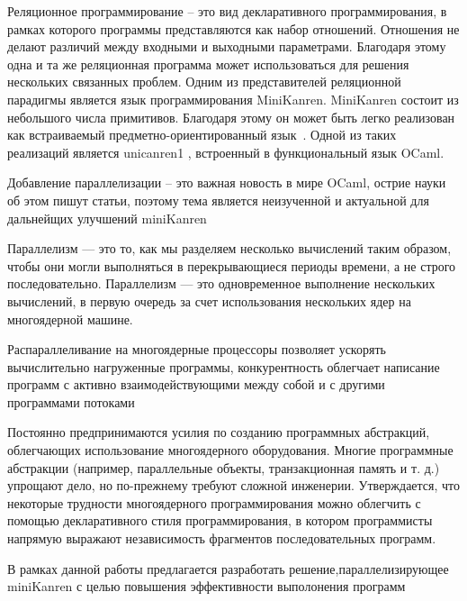

Реляционное программирование – это вид декларативного программирования, в рамках которого программы представляются как набор
отношений. Отношения не делают различий между входными и выходными параметрами. Благодаря этому одна и та же реляционная
программа может использоваться для решения нескольких связанных
проблем. Одним из представителей реляционной парадигмы является
язык программирования MiniKanren. MiniKanren состоит из небольшого числа примитивов. Благодаря этому он может быть легко реализован как встраиваемый предметно-ориентированный язык~\cite{moiseenko_podkopaev}. Одной из
таких реализаций является unicanren1
, встроенный в функциональный
язык OCaml.

Добавление параллелизации -- это важная новость в мире OCaml, острие науки об этом пишут статьи,
поэтому тема является неизученной и актуальной для дальнейщих улучшений miniKanren

Параллелизм — это то, как мы разделяем несколько вычислений таким образом, чтобы они могли выполняться в перекрывающиеся периоды времени, а не строго последовательно. Параллелизм — это одновременное выполнение нескольких вычислений, в первую очередь за счет использования нескольких ядер на многоядерной машине.  

Распараллеливание на многоядерные процессоры позволяет ускорять вычислительно нагруженные программы, конкурентность облегчает написание программ с активно взаимодействующими между собой и с другими программами потоками

Постоянно предпринимаются усилия по созданию программных абстракций, облегчающих использование многоядерного оборудования. Многие программные абстракции (например, параллельные объекты, транзакционная память и т. д.) упрощают дело, но по-прежнему требуют сложной инженерии. Утверждается, что некоторые трудности многоядерного программирования можно облегчить с помощью декларативного стиля программирования, в котором программисты напрямую выражают независимость фрагментов последовательных программ.

В рамках данной работы предлагается разработать решение,параллелизирующее miniKanren с целью повышения эффективности выполонения программ
